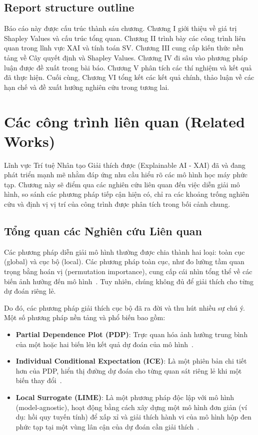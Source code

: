 \documentclass[12pt, a4paper]{article}
\theoremstyle{plain}
\theoremstyle{proposition}
\theoremstyle{lemma}
\begin{document}
\subsection{Report structure outline}
Báo cáo này được cấu trúc thành sáu chương. Chương I giới thiệu về giá trị Shapley Values và cấu trúc tổng quan. Chương II trình bày các công trình liên quan trong lĩnh vực XAI và tính toán SV. Chương III cung cấp kiến thức nền tảng về Cây quyết định và Shapley Values. Chương IV đi sâu vào phương pháp luận được đề xuất trong bài báo. Chương V phân tích các thí nghiệm và kết quả đã thực hiện. Cuối cùng, Chương VI tổng kết các kết quả chính, thảo luận về các hạn chế và đề xuất hướng nghiên cứu trong tương lai.

\section{Các công trình liên quan (Related Works)}

Lĩnh vực Trí tuệ Nhân tạo Giải thích được (Explainable AI - XAI) đã và đang phát triển mạnh mẽ nhằm đáp ứng nhu cầu hiểu rõ các mô hình học máy phức tạp. Chương này sẽ điểm qua các nghiên cứu liên quan đến việc diễn giải mô hình, so sánh các phương pháp tiếp cận hiện có, chỉ ra các khoảng trống nghiên cứu và định vị vị trí của công trình được phân tích trong bối cảnh chung.

\subsection{Tổng quan các Nghiên cứu Liên quan}

Các phương pháp diễn giải mô hình thường được chia thành hai loại: toàn cục (global) và cục bộ (local). Các phương pháp toàn cục, như đo lường tầm quan trọng bằng hoán vị (permutation importance), cung cấp cái nhìn tổng thể về các biến ảnh hưởng đến mô hình~\citep{breiman2001random}. Tuy nhiên, chúng không đủ để giải thích cho từng dự đoán riêng lẻ.

Do đó, các phương pháp giải thích cục bộ đã ra đời và thu hút nhiều sự chú ý. Một số phương pháp nền tảng và phổ biến bao gồm:
\begin{itemize}
    \item \textbf{Partial Dependence Plot (PDP)}: Trực quan hóa ảnh hưởng trung bình của một hoặc hai biến lên kết quả dự đoán của mô hình~\citep{Friedman2001}.
    \item \textbf{Individual Conditional Expectation (ICE)}: Là một phiên bản chi tiết hơn của PDP, hiển thị đường dự đoán cho từng quan sát riêng lẻ khi một biến thay đổi~\citep{goldstein2014peeking}.
    \item \textbf{Local Surrogate (LIME)}: Là một phương pháp độc lập với mô hình (model-agnostic), hoạt động bằng cách xây dựng một mô hình đơn giản (ví dụ: hồi quy tuyến tính) để xấp xỉ và giải thích hành vi của mô hình hộp đen phức tạp tại một vùng lân cận của dự đoán cần giải thích~\citep{ribeiro2016why}.
\end{itemize}
\end{document}
